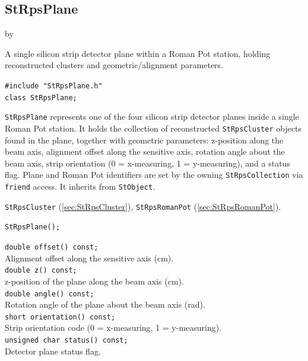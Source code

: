 \documentclass[twoside]{article}
\newcommand{\entrylabel}[1]{\mbox{\textbf{{#1}}}\hfil}%
\newenvironment{entry}
{\begin{list}{}%
    {\renewcommand{\makelabel}{\entrylabel}%
     \setlength{\labelwidth}{90pt}%
     \setlength{\leftmargin}{\labelwidth}
     \advance\leftmargin by \labelsep%
      }%
    }%
  {\end{list}}
\newcommand{\Entrylabel}[1]%
{\raisebox{0pt}[1ex][0pt]{\makebox[\labelwidth][l]%
    {\parbox[t]{\labelwidth}{\hspace{0pt}\textbf{{#1}}}}}}
\newenvironment{Entry}%
{\renewcommand{\entrylabel}{\Entrylabel}\begin{entry}}%
  {\end{entry}}
\begin{document}
\subsection{StRpsPlane}
\label{sec:StRpsPlane}
\begin{Entry}
\item[Summary] A single silicon strip detector plane within a Roman Pot station,
    holding reconstructed clusters and geometric/alignment parameters.
\item[Synopsis]
    \verb+#include "StRpsPlane.h"+\\
    \verb+class StRpsPlane;+\\
\item[Description]
    \texttt{StRpsPlane} represents one of the four silicon strip detector planes
    inside a single Roman Pot station.  It holds the collection of reconstructed
    \texttt{StRpsCluster} objects found in the plane, together with geometric
    parameters: z-position along the beam axis, alignment offset along the
    sensitive axis, rotation angle about the beam axis, strip orientation (0 =
    x-measuring, 1 = y-measuring), and a status flag.  Plane and Roman Pot
    identifiers are set by the owning \texttt{StRpsCollection} via
    \texttt{friend} access.
    It inherits from \texttt{StObject}.
\item[Related Classes]
    \texttt{StRpsCluster} (\ref{sec:StRpsCluster}),
    \texttt{StRpsRomanPot} (\ref{sec:StRpsRomanPot}).
\item[Public\\ Constructors]
    \verb+StRpsPlane();+\\
\item[Public Member\\ Functions]
    \verb+double offset() const;+\\
    Alignment offset along the sensitive axis (cm).\\
    \verb+double z() const;+\\
    z-position of the plane along the beam axis (cm).\\
    \verb+double angle() const;+\\
    Rotation angle of the plane about the beam axis (rad).\\
    \verb+short orientation() const;+\\
    Strip orientation code (0 = x-measuring, 1 = y-measuring).\\
    \verb+unsigned char status() const;+\\
    Detector plane status flag.\\

\end{Entry}
\end{document}
